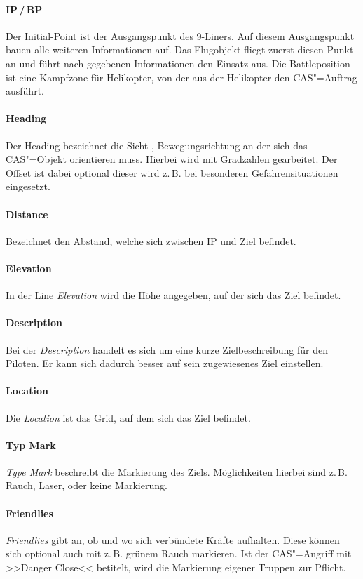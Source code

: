 \paragraph*{IP\,/\,BP}
	Der Initial-Point ist der Ausgangspunkt des 9-Liners. Auf diesem Ausgangspunkt bauen
	alle weiteren Informationen auf. Das Flugobjekt fliegt zuerst diesen Punkt an und führt
	nach gegebenen Informationen den Einsatz aus.
	Die Battleposition ist eine Kampfzone für Helikopter, von der aus der Helikopter den CAS"=Auftrag ausführt.
\paragraph*{Heading}
	Der Heading bezeichnet die Sicht-, Bewegungsrichtung an der sich das CAS"=Objekt
	orientieren muss. Hierbei wird mit Gradzahlen gearbeitet. Der Offset ist dabei optional
	dieser wird z.\,B. bei besonderen Gefahrensituationen eingesetzt.
\paragraph*{Distance}
	Bezeichnet den Abstand, welche sich zwischen IP und Ziel befindet.
\paragraph*{Elevation}
	In der Line \textit{Elevation} wird die Höhe angegeben, auf der sich das Ziel befindet.
\paragraph*{Description}
	Bei der \textit{Description} handelt es sich um eine kurze Zielbeschreibung für den Piloten. Er kann sich dadurch besser auf sein zugewiesenes Ziel einstellen.
\paragraph*{Location}
	Die \textit{Location} ist das Grid, auf dem sich das Ziel befindet.
\paragraph*{Typ Mark}
	\textit{Type Mark} beschreibt die Markierung des Ziels. Möglichkeiten hierbei sind z.\,B. Rauch, Laser, oder keine Markierung.
\paragraph*{Friendlies}
	\textit{Friendlies} gibt an, ob und wo sich verbündete Kräfte aufhalten. Diese können sich optional auch mit z.\,B. grünem Rauch markieren. Ist der CAS"=Angriff mit >>Danger Close<< betitelt, wird die Markierung eigener Truppen zur Pflicht.

